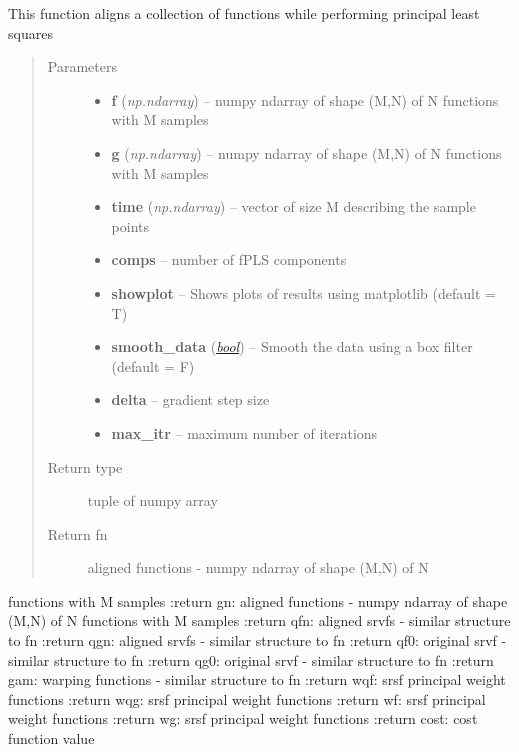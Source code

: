 \documentclass[letterpaper,10pt,english]{sphinxmanual}
\begin{document}
\begin{fulllineitems}
\label{time_warping:time_warping.align_fPLS}
This function aligns a collection of functions while performing
principal least squares
\begin{quote}\begin{description}
\item[{Parameters}] \leavevmode\begin{itemize}
\item {} 
\textbf{f} (\emph{np.ndarray}) -- numpy ndarray of shape (M,N) of N functions with M samples

\item {} 
\textbf{g} (\emph{np.ndarray}) -- numpy ndarray of shape (M,N) of N functions with M samples

\item {} 
\textbf{time} (\emph{np.ndarray}) -- vector of size M describing the sample points

\item {} 
\textbf{comps} -- number of fPLS components

\item {} 
\textbf{showplot} -- Shows plots of results using matplotlib (default = T)

\item {} 
\textbf{smooth\_data} (\href{http://docs.python.org/library/functions.html\#bool}{\emph{bool}}) -- Smooth the data using a box filter (default = F)

\item {} 
\textbf{delta} -- gradient step size

\item {} 
\textbf{max\_itr} -- maximum number of iterations

\end{itemize}

\item[{Return type}] \leavevmode
tuple of numpy array

\item[{Return fn}] \leavevmode
aligned functions - numpy ndarray of shape (M,N) of N

\end{description}\end{quote}

functions with M samples
:return gn: aligned functions - numpy ndarray of shape (M,N) of N
functions with M samples
:return qfn: aligned srvfs - similar structure to fn
:return qgn: aligned srvfs - similar structure to fn
:return qf0: original srvf - similar structure to fn
:return qg0: original srvf - similar structure to fn
:return gam: warping functions - similar structure to fn
:return wqf: srsf principal weight functions
:return wqg: srsf principal weight functions
:return wf: srsf principal weight functions
:return wg: srsf principal weight functions
:return cost: cost function value

\end{fulllineitems}
\end{document}
